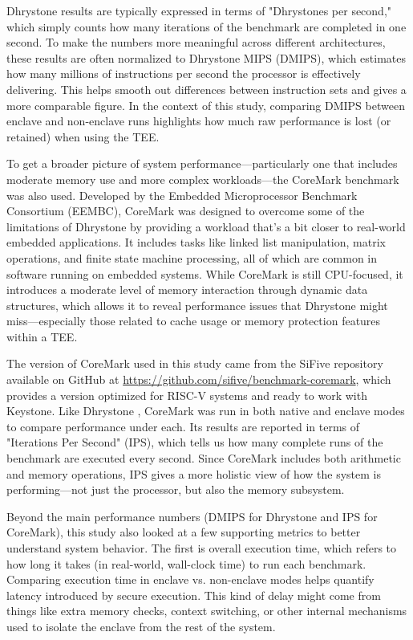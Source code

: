 Dhrystone results are typically expressed in terms of "Dhrystones per second," which simply counts how many iterations of the benchmark are completed in one second. To make the numbers more meaningful across different architectures, these results are often normalized to Dhrystone MIPS (DMIPS), which estimates how many millions of instructions per second the processor is effectively delivering. This helps smooth out differences between instruction sets and gives a more comparable figure. In the context of this study, comparing DMIPS between enclave and non-enclave runs highlights how much raw performance is lost (or retained) when using the TEE.

To get a broader picture of system performance—particularly one that includes moderate memory use and more complex workloads—the CoreMark benchmark \cite{gal2012exploring} was also used. Developed by the Embedded Microprocessor Benchmark Consortium (EEMBC), CoreMark \cite{gal2012exploring} was designed to overcome some of the limitations of Dhrystone by providing a workload that’s a bit closer to real-world embedded applications. It includes tasks like linked list manipulation, matrix operations, and finite state machine processing, all of which are common in software running on embedded systems. While CoreMark \cite{gal2012exploring} is still CPU-focused, it introduces a moderate level of memory interaction through dynamic data structures, which allows it to reveal performance issues that Dhrystone might miss—especially those related to cache usage or memory protection features within a TEE.

The version of CoreMark \cite{gal2012exploring} used in this study came from the SiFive repository available on GitHub at \url{https://github.com/sifive/benchmark-coremark}, which provides a version optimized for RISC-V systems and ready to work with Keystone. Like Dhrystone \cite{weiss2002dhrystone}, CoreMark \cite{gal2012exploring} was run in both native and enclave modes to compare performance under each. Its results are reported in terms of "Iterations Per Second" (IPS), which tells us how many complete runs of the benchmark are executed every second. Since CoreMark includes both arithmetic and memory operations, IPS gives a more holistic view of how the system is performing—not just the processor, but also the memory subsystem.

Beyond the main performance numbers (DMIPS for Dhrystone and IPS for CoreMark), this study also looked at a few supporting metrics to better understand system behavior. The first is overall execution time, which refers to how long it takes (in real-world, wall-clock time) to run each benchmark. Comparing execution time in enclave vs. non-enclave modes helps quantify latency introduced by secure execution. This kind of delay might come from things like extra memory checks, context switching, or other internal mechanisms used to isolate the enclave from the rest of the system.

